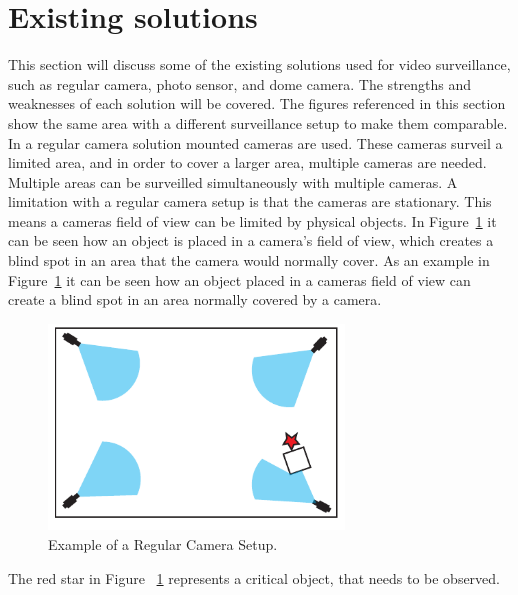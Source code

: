 \section{Existing solutions}
This section will discuss some of the existing solutions used for video surveillance, such as regular camera, photo sensor, and dome camera.
The strengths and weaknesses of each solution will be covered.
The figures referenced in this section show the same area with a different surveillance setup to make them comparable. \\

In a regular camera solution mounted cameras are used.
These cameras surveil a limited area, and in order to cover a larger area, multiple cameras are needed.
Multiple areas can be surveilled simultaneously with multiple cameras.
A limitation with a regular camera setup is that the cameras are stationary.
This means a cameras field of view can be limited by physical objects.
In Figure~\ref{} it can be seen how an object is placed in a camera's field of view, which creates a blind spot in an area that the camera would normally cover.
As an example in Figure~\ref{fig:refular_camera_setup} it can be seen how an object placed in a cameras field of view can create a blind spot in an area normally covered by a camera. \\

\begin{figure}[htb]
    \centering
    \includegraphics[width=0.7\textwidth]{gfx/regular_camera_setup.pdf}
    \caption{Example of a Regular Camera Setup.}
    \label{fig:refular_camera_setup}
\end{figure}


The red star in Figure ~\ref{fig:refular_camera_setup} represents a critical object, that needs to be observed. \\

